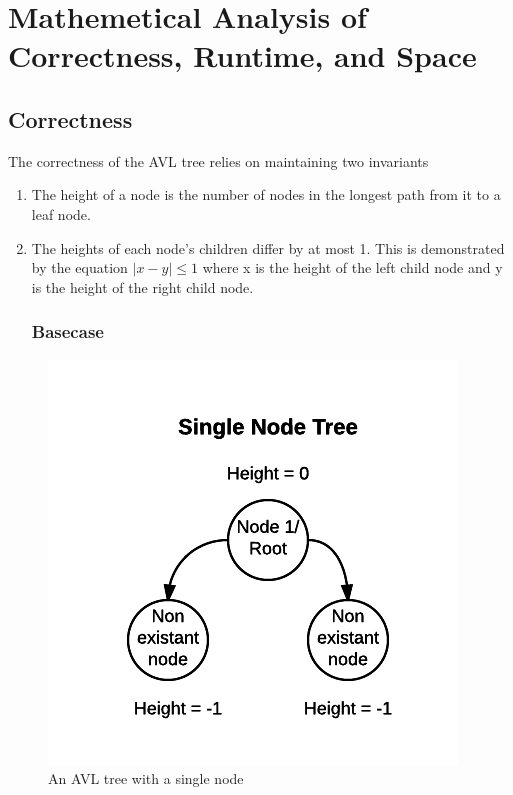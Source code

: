 \documentclass[12pt]{article}
\begin{document}
\section*{Mathemetical Analysis of Correctness, Runtime, and Space}

\subsection*{Correctness}
The correctness of the AVL tree relies on maintaining two invariants
\begin{enumerate}
  \item The height of a node is the number of nodes in the longest path from it
  to a leaf node.
  \item The heights of each node's children differ by at most 1.  This is
  demonstrated by the equation $|x-y| \le 1$ where x is the height of the left
  child node and y is the height of the right child node.
\subsubsection*{Basecase}
\end{enumerate}
\begin{figure}[h]
\caption{An AVL tree with a single node}
\includegraphics{single_node_tree.png}
\centering
\end{figure}
\noindent
\end{document}
